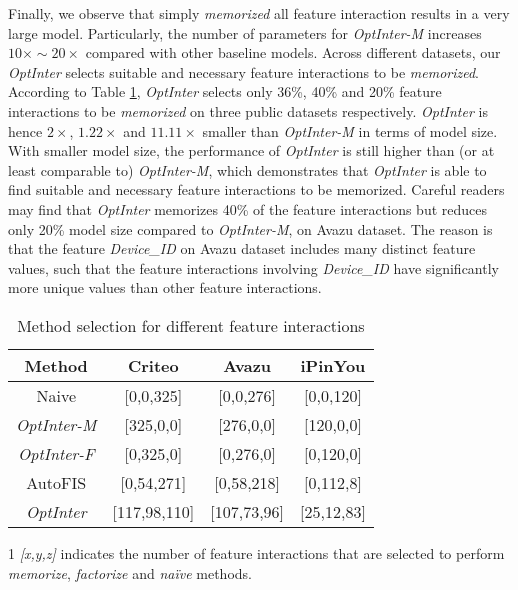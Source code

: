 \documentclass[conference]{IEEEtran}
\begin{document}
Finally, we observe that simply \emph{memorized} all feature interaction results in a very large model. Particularly, the number of parameters for \textit{OptInter-M} increases $10\times \sim 20\times$ compared with other baseline models. Across different datasets, our \emph{OptInter} selects suitable and necessary feature interactions to be \emph{memorized}. 
According to Table \ref{Table:arch}, \emph{OptInter} selects only 36\%, 40\% and 20\% feature interactions to be \emph{memorized} on three public datasets respectively. \textit{OptInter} is hence $2\times$, $1.22\times$ and $11.11\times$ smaller than \textit{OptInter-M} in terms of model size. With smaller model size, the performance of \textit{OptInter} is still higher than (or at least comparable to) \textit{OptInter-M}, which demonstrates that \textit{OptInter} is able to find suitable and necessary feature interactions to be memorized. Careful readers may find that \textit{OptInter} memorizes 40\% of the feature interactions but reduces only 20\% model size compared to  \textit{OptInter-M}, on Avazu dataset. The reason is that the feature \textit{Device\_ID} on Avazu dataset includes many distinct feature values, such that the feature interactions involving \textit{Device\_ID} have significantly more unique values than other feature interactions.

\begin{table}[!htbp]
    \renewcommand\arraystretch{1.00}
	\centering
	\caption{Method selection for different feature interactions}
	\begin{tabular}{c|ccc}
		\hline
		  Method & Criteo & Avazu & iPinYou \\
		\hline
		  Naive & [0,0,325] & [0,0,276] & [0,0,120] \\
		  \textit{OptInter-M} & [325,0,0] & [276,0,0] & [120,0,0] \\
		  \textit{OptInter-F} & [0,325,0] & [0,276,0] & [0,120,0] \\ 
		  AutoFIS & [0,54,271] & [0,58,218] & [0,112,8]\\
		  \textit{OptInter} & [117,98,110] & [107,73,96] & [25,12,83] \\
		\hline
	\end{tabular}
	\begin{tablenotes}
    \footnotesize
    \item[1] \textit{[x,y,z]} indicates the number of feature interactions that are selected to perform \emph{memorize}, \emph{factorize} and \emph{naïve} methods. 
    \end{tablenotes}
	\label{Table:arch}
\end{table}
\end{document}
